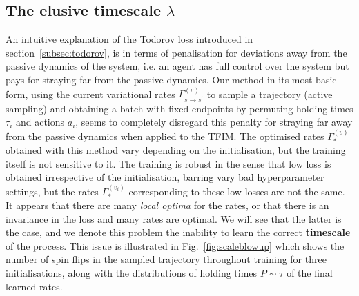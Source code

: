 \subsection{The elusive timescale $\lambda$}
\label{subsec:elusive_lambda}
An intuitive explanation of the Todorov loss introduced in section~\ref{subsec:todorov}, is in terms of penalisation for deviations away from the passive dynamics of the system, i.e. an agent has full control over the system but pays for straying far from the passive dynamics. Our method in its most basic form, using the current variational rates $\Gamma^{(v)}_{s \rightarrow s^\prime}$ to sample a trajectory (active sampling) and obtaining a batch with fixed endpoints by permuting holding times $\tau_i$ and actions $a_i$, seems to completely disregard this penalty for straying far away from the passive dynamics when applied to the TFIM. The optimised rates $\Gamma_*^{(v)}$ obtained with this method vary depending on the initialisation, but the training itself is not sensitive to it. The training is robust in the sense that low loss is obtained irrespective of the initialisation, barring vary bad hyperparameter settings, but the rates $\Gamma_*^{(v_i)}$ corresponding to these low losses are not the same. It appears that there are many \emph{local optima} for the rates, or that there is an invariance in the loss and many rates are optimal. We will see that the latter is the case, and we denote this problem the inability to learn the correct \textbf{timescale} of the process. This issue is illustrated in Fig.~\ref{fig:scaleblowup} which shows the number of spin flips in the sampled trajectory throughout training for three initialisations, along with the distributions of holding times $P \sim \tau$ of the final learned rates. 
